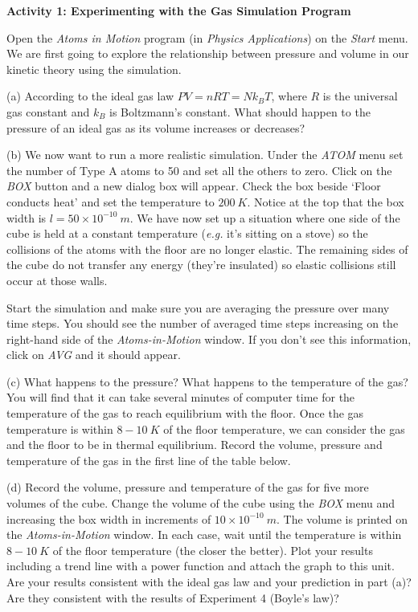 \textbf{Activity 1: Experimenting with the Gas Simulation Program}

Open the {\it Atoms in Motion} program (in {\it Physics Applications}) on the {\it Start} menu.
We are first going to explore the relationship between pressure and volume in
our kinetic theory using the simulation. 

(a) According to the ideal gas law \( PV = nRT = Nk_{B}T \), where \( R \) is the universal gas constant and \( k_{B} \) is Boltzmann's constant. What
should happen to the pressure of an ideal gas as its volume increases
or decreases?
\vspace{1.0in}

(b) We now want to run a more realistic simulation.
Under the {\it ATOM} menu set the number of Type A atoms to 50 and set all the others to zero.
Click on the {\it BOX} button and a new dialog box will appear.
Check the box beside `Floor conducts heat' and set the temperature to $200~K$.
Notice at the top that the box width is $l=50 \times 10^{-10}~m$.
We have now set up a situation where one side of the cube is held at a constant
temperature ({\it e.g.} it's sitting on a stove) so the collisions of the atoms with the
floor are no longer elastic.
The remaining sides of the
cube do not transfer any energy (they're insulated) so elastic collisions still occur 
at those walls.

Start
the simulation and make sure you are averaging the pressure over many time steps.
You should see the number of averaged time steps increasing on the right-hand side 
of the {\it Atoms-in-Motion} window. 
If you don't see this information, click on {\it AVG} and it should appear.

\newpage

(c) What happens to the pressure?
What happens to the temperature of the gas? 
You will find that it can take several minutes of computer time for the temperature of the gas to reach equilibrium with the floor.
Once the gas temperature is within $8-10~K$ of the floor temperature, we can consider the gas and the floor to be in thermal equilibrium. Record the volume, pressure and temperature of the gas in the first line of the table below.
\vspace{20mm}

(d) Record the volume, pressure and temperature of the gas for five more volumes of the cube. Change the volume of the cube using the {\it BOX} menu and 
increasing the box width in increments of $10 \times 10^{-10}~m$. The volume 
is printed on the {\it Atoms-in-Motion} window. In each case, wait until the
temperature is within $8-10~K$ of the floor temperature (the closer the better).
Plot your results including a trend line with a power function and attach the 
graph to this unit. Are your results consistent with the ideal gas law and
your prediction in part (a)? Are they consistent with the results of 
Experiment 4 (Boyle's law)?

